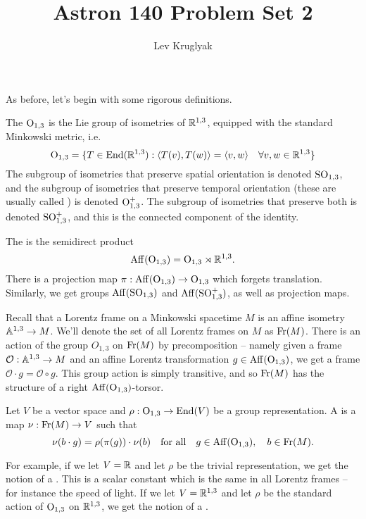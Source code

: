 \documentclass{../../templates/lkx_pset}
\title{Astron 140 Problem Set 2}
\author{Lev Kruglyak}
\begin{document}
\maketitle

As before, let's begin with some rigorous definitions.
\begin{definition}
	The  $\mathrm{O}_{1,3}$ is the Lie group of isometries of $\mathbb{R}^{1,3}$, equipped with the standard Minkowski metric, i.e.
	\[
		\mathrm{O}_{1,3} = \{
		T \in \textrm{End}(\mathbb{R}^{1,3}) : \langle T(v), T(w) \rangle = \langle v,w\rangle\quad\forall v,w\in \mathbb{R}^{1,3}
		\}
	\]
	The subgroup of isometries that preserve spatial orientation is denoted $\mathrm{SO}_{1,3}$, and the subgroup of isometries that preserve temporal orientation (these are usually called ) is denoted $\mathrm{O}^+_{1,3}$. The subgroup of isometries that preserve both is denoted $\mathrm{SO}_{1,3}^+$, and this is the connected component of the identity.
\end{definition}

\begin{definition}
	The  is the semidirect product
	\[
		\mathrm{Aff}(\mathrm{O}_{1,3}) = \mathrm{O}_{1,3}\rtimes \mathbb{R}^{1,3}.
	\]
	There is a projection map $\pi : \mathrm{Aff}(\mathrm{O}_{1,3}) \to \mathrm{O}_{1,3}$ which forgets translation.
	Similarly, we get groups $\mathrm{Aff}(\mathrm{SO}_{1,3})$ and $\mathrm{Aff}(\mathrm{SO}_{1,3}^+)$, as well as projection maps.
\end{definition}


Recall that a Lorentz frame on a Minkowski spacetime $M$ is an affine isometry $\mathbb{A}^{1,3} \to M$. We'll denote the set of all Lorentz frames on $M$ as $\mathrm{Fr}(M)$. There is an action of the group $O_{1,3}$ on $\mathrm{Fr}(M)$ by precomposition -- namely given a frame $\mathcal{O} : \mathbb{A}^{1,3} \to M$ and an affine Lorentz transformation $g\in \mathrm{Aff}(\mathrm{O}_{1,3})$, we get a frame $\mathcal{O}\cdot g = \mathcal{O}\circ g$. This group action is simply transitive, and so $\mathrm{Fr}(M)$ has the structure of a right $\mathrm{Aff}(\mathrm{O}_{1,3})$-torsor.

\begin{definition}
	Let $V$ be a vector space and $\rho : \mathrm{O}_{1,3} \to \textrm{End}(V)$ be a group representation. A  is a map $\nu : \mathrm{Fr}(M) \to V$ such that
	\[
		\nu(b\cdot g) = \rho(\pi(g))\cdot \nu(b) \quad\textrm{for all}\quad g\in \mathrm{Aff}(\mathrm{O}_{1,3}),\quad b\in \mathrm{Fr}(M).
	\]
\end{definition}
For example, if we let $V=\mathbb{R}$ and let $\rho$ be the trivial representation, we get the notion of a . This is a scalar constant which is the same in all Lorentz frames -- for instance the speed of light. If we let $V=\mathbb{R}^{1,3}$ and let $\rho$ be the standard action of $\mathrm{O}_{1,3}$ on $\mathbb{R}^{1,3}$, we get the notion of a .
\pagebreak
\end{document}
